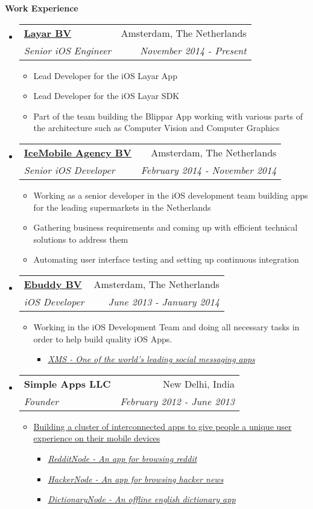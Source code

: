 \documentclass[letterpaper,11pt]{article}
\makeatletter
\newcommand{\resitem}[1]{\item #1 \vspace{-2pt}}
\newcommand{\resheading}[1]{{\large \colorbox{mygrey}{\begin{minipage}{\textwidth}{\textbf{#1 \vphantom{p\^{E}}}}\end{minipage}}}}
\newcommand{\ressubheading}[4]{
\begin{tabular*}{7.0in}{l@{\extracolsep{\fill}}r}
    \textbf{#1} & #2 \\
    \textit{#3} & \textit{#4} \\
\end{tabular*}\vspace{-6pt}}
\makeatother
\begin{document}
\resheading{Work Experience}
\begin{itemize}

\item
    \ressubheading{\href{https://www.layar.com/}{Layar BV}}{Amsterdam, The Netherlands}{Senior iOS Engineer}{November 2014 - Present}
    \begin{itemize}
        \resitem{Lead Developer for the iOS Layar App}
        \resitem{Lead Developer for the iOS Layar SDK}
        \resitem{Part of the team building the Blippar App working with various parts of the architecture such as Computer Vision and Computer Graphics}
    \end{itemize}

\item
    \ressubheading{\href{http://www.icemobile.com}{IceMobile Agency BV}}{Amsterdam, The Netherlands}{Senior iOS Developer}{February 2014 - November 2014}
    \begin{itemize}
        \resitem{Working as a senior developer in the iOS development team building apps for the leading supermarkets in the Netherlands}
        \resitem{Gathering business requirements and coming up with efficient technical solutions to address them}
        \resitem{Automating user interface testing and setting up continuous integration}
    \end{itemize}

\item
    \ressubheading{\href{http://www.ebuddy.com}{Ebuddy BV}}{Amsterdam, The Netherlands}{iOS Developer}{June 2013 - January 2014}
    \begin{itemize}
        \resitem{Working in the iOS Development Team and doing all necessary tasks in order to help build quality iOS Apps.}
  \begin{itemize}
             \resitem{\href{https://itunes.apple.com/ca/app/xms-unlimited-messaging.-better./id425154540?mt=8}{\emph{XMS - One of the world's leading social messaging apps}}}
        \end{itemize}
    \end{itemize}

\item
    \ressubheading{Simple Apps LLC}{New Delhi, India}{Founder}{February 2012 - June 2013}
    \begin{itemize}
        \resitem{\href{http://www.nodemesh.net}{Building a cluster of interconnected apps to give people a unique user experience on their mobile devices}}
        \begin{itemize}
           \resitem{\href{https://itunes.apple.com/ca/app/redditnode/id555533903?mt=8}{\emph{RedditNode - An app for browsing reddit}}}
            \resitem{\href{https://itunes.apple.com/ca/app/hackernode/id473882597?mt=8}{\emph{HackerNode - An app for browsing hacker news}}}
            \resitem{\href{https://itunes.apple.com/ca/app/dictionarynode/id538492050?mt=8}{\emph{DictionaryNode - An offline english dictionary app}}}
        \end{itemize}
    \end{itemize}


\end{itemize}
\end{document}
